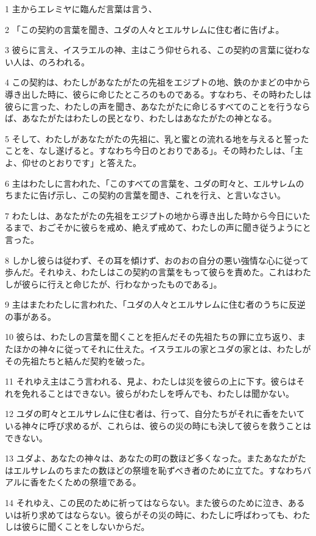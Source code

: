 \par 1 主からエレミヤに臨んだ言葉は言う、
\par 2 「この契約の言葉を聞き、ユダの人々とエルサレムに住む者に告げよ。
\par 3 彼らに言え、イスラエルの神、主はこう仰せられる、この契約の言葉に従わない人は、のろわれる。
\par 4 この契約は、わたしがあなたがたの先祖をエジプトの地、鉄のかまどの中から導き出した時に、彼らに命じたところのものである。すなわち、その時わたしは彼らに言った、わたしの声を聞き、あなたがたに命じるすべてのことを行うならば、あなたがたはわたしの民となり、わたしはあなたがたの神となる。
\par 5 そして、わたしがあなたがたの先祖に、乳と蜜との流れる地を与えると誓ったことを、なし遂げると。すなわち今日のとおりである」。その時わたしは、「主よ、仰せのとおりです」と答えた。
\par 6 主はわたしに言われた、「このすべての言葉を、ユダの町々と、エルサレムのちまたに告げ示し、この契約の言葉を聞き、これを行え、と言いなさい。
\par 7 わたしは、あなたがたの先祖をエジプトの地から導き出した時から今日にいたるまで、おごそかに彼らを戒め、絶えず戒めて、わたしの声に聞き従うようにと言った。
\par 8 しかし彼らは従わず、その耳を傾けず、おのおの自分の悪い強情な心に従って歩んだ。それゆえ、わたしはこの契約の言葉をもって彼らを責めた。これはわたしが彼らに行えと命じたが、行わなかったものである」。
\par 9 主はまたわたしに言われた、「ユダの人々とエルサレムに住む者のうちに反逆の事がある。
\par 10 彼らは、わたしの言葉を聞くことを拒んだその先祖たちの罪に立ち返り、またほかの神々に従ってそれに仕えた。イスラエルの家とユダの家とは、わたしがその先祖たちと結んだ契約を破った。
\par 11 それゆえ主はこう言われる、見よ、わたしは災を彼らの上に下す。彼らはそれを免れることはできない。彼らがわたしを呼んでも、わたしは聞かない。
\par 12 ユダの町々とエルサレムに住む者は、行って、自分たちがそれに香をたいている神々に呼び求めるが、これらは、彼らの災の時にも決して彼らを救うことはできない。
\par 13 ユダよ、あなたの神々は、あなたの町の数ほど多くなった。またあなたがたはエルサレムのちまたの数ほどの祭壇を恥ずべき者のために立てた。すなわちバアルに香をたくための祭壇である。
\par 14 それゆえ、この民のために祈ってはならない。また彼らのために泣き、あるいは祈り求めてはならない。彼らがその災の時に、わたしに呼ばわっても、わたしは彼らに聞くことをしないからだ。
